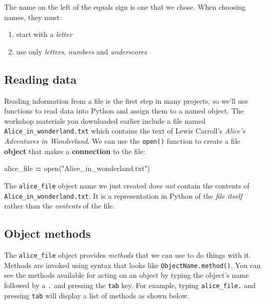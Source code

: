 \documentclass[]{book}
\newenvironment{Shaded}{\begin{snugshade}}{\end{snugshade}}
\newcommand{\StringTok}[1]{\textcolor[rgb]{0.31,0.60,0.02}{#1}}
\newcommand{\OperatorTok}[1]{\textcolor[rgb]{0.81,0.36,0.00}{\textbf{#1}}}
\newcommand{\BuiltInTok}[1]{#1}
\newcommand{\NormalTok}[1]{#1}
\providecommand{\tightlist}{%
  \setlength{\itemsep}{0pt}\setlength{\parskip}{0pt}}
\begin{document}
The name on the left of the equals sign is one that we chose. When
choosing names, they must:

\begin{enumerate}
\def\labelenumi{\arabic{enumi}.}
\tightlist
\item
  start with a \emph{letter}
\item
  use only \emph{letters}, \emph{numbers} and \emph{underscores}
\end{enumerate}

\subsection{Reading data}\label{reading-data-1}

Reading information from a file is the first step in many projects, so
we'll use functions to read data into Python and assign them to a named
object. The workshop materials you downloaded earlier include a file
named \texttt{Alice\_in\_wonderland.txt} which contains the text of
Lewis Carroll's \emph{Alice's Adventures in Wonderland}. We can use the
\texttt{open()} function to create a file \textbf{object} that makes a
\textbf{connection} to the file:

\begin{Shaded}
\begin{Highlighting}[]
\NormalTok{alice_file }\OperatorTok{=} \BuiltInTok{open}\NormalTok{(}\StringTok{"Alice_in_wonderland.txt"}\NormalTok{)}
\end{Highlighting}
\end{Shaded}

The \texttt{alice\_file} object name we just created does \emph{not}
contain the contents of \texttt{Alice\_in\_wonderland.txt}. It is a
representation in Python of the \emph{file itself} rather than the
\emph{contents} of the file.

\subsection{Object methods}\label{object-methods}

The \texttt{alice\_file} object provides \emph{methods} that we can use
to do things with it. Methods are invoked using syntax that looks like
\texttt{ObjectName.method()}. You can see the methods available for
acting on an object by typing the object's name followed by a \texttt{.}
and pressing the \texttt{tab} key. For example, typing
\texttt{alice\_file.} and pressing \texttt{tab} will display a list of
methods as shown below.
\end{document}
